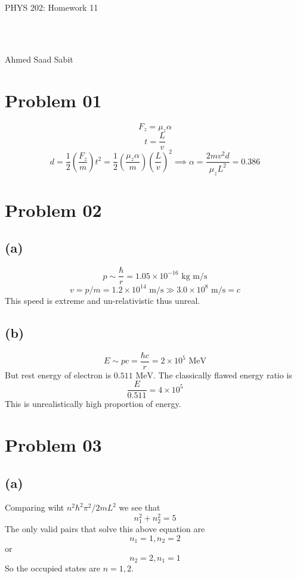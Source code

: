 \documentclass[a4paper]{article}
\newcommand{\hb}{\hbar}
\begin{document}
\begin{center}
	\begin{huge}
		PHYS 202: Homework 11
	\end{huge}\\ 
	\
	\\
	\begin{Large}
		Ahmed Saad Sabit
	\end{Large}
\end{center}	
\section*{Problem 01} 
\[
F_z = \mu_z \alpha
\] 
\[
t = \frac{L}{v}
\] 
\[
d = \frac{1}{2} (\frac{F_z}{m}) t^2 = \frac{1}{2} 
\left(
\frac{\mu_z \alpha}{m}
\right)
\left(\frac{L}{v}\right)^2 \implies  \alpha = 
\frac{2 m v^2 d }{\mu_z L^2}  =
\boxed{
0.386
}
\] 

\section*{Problem 02}
\subsection*{(a)} 
\[
p \sim \frac{\hb}{r} = 1.05 \times 10^{-16} \text{ kg m/s}
\] 
\[
v = p  / m = 1.2 \times 10^{14} \text{ m/s} \gg 3.0 \times 10^{8} \text{ m/s} = c
\] 
This speed is extreme and un-relativistic thus unreal. 

\subsection*{(b)} 
\[
E \sim pc = \frac{\hb c}{r} = 2 \times 10^{5} \text{ MeV}
\] 
But rest energy of electron is $0.511 \text{ MeV}$. The classically flawed energy ratio is
\[
\frac{E}{0.511 } = 4 \times  10 ^{5} 
\] 
This is unrealistically high proportion of energy. 






\section*{Problem 03}
\subsection*{(a)} 
Comparing wiht $n^2 \hb ^2 \pi ^2 / 2 m L ^2$ we see that 
\[
n_1 ^2 + n_2 ^2 = 5
\] 
The only valid pairs that solve this above equation are 
\[
n_1 = 1, n_2 = 2 
\] 
or
\[
n_2 = 2, n_1 = 1
\] 
So the occupied states are $n = 1,2$.
\end{document}
